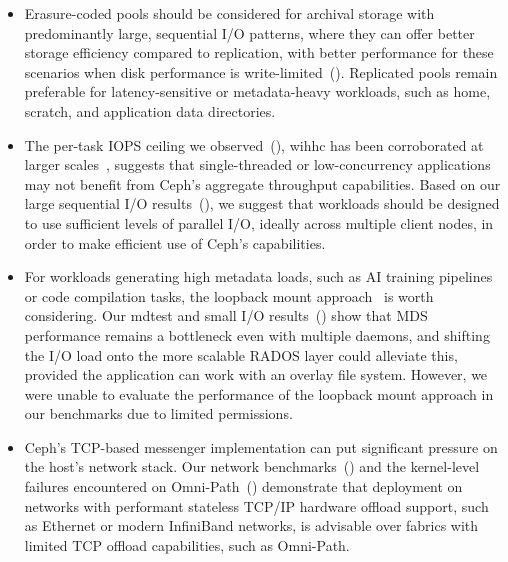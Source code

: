\begin{itemize}
    \item Erasure-coded pools should be considered for archival storage with predominantly large, sequential \ac{I/O} patterns, where they can offer better storage efficiency compared to replication, with better performance for these scenarios when disk performance is write-limited~(). Replicated pools remain preferable for latency-sensitive or metadata-heavy workloads, such as home, scratch, and application data directories.

    \item The per-task \ac{IOPS} ceiling we observed~(), wihhc has been corroborated at larger scales~\cite{ceph-1tib}, suggests that single-threaded or low-concurrency applications may not benefit from Ceph's aggregate throughput capabilities. Based on our large sequential \ac{I/O} results~(), we suggest that workloads should be designed to use sufficient levels of parallel \ac{I/O}, ideally across multiple client nodes, in order to make efficient use of Ceph's capabilities.

    \item For workloads generating high metadata loads, such as \ac{AI} training pipelines or code compilation tasks, the loopback mount approach~\cite{Krotkiewski_2017} is worth considering. Our mdtest and small \ac{I/O} results~() show that \ac{MDS} performance remains a bottleneck even with multiple daemons, and shifting the \ac{I/O} load onto the more scalable \ac{RADOS} layer could alleviate this, provided the application can work with an overlay file system. However, we were unable to evaluate the performance of the loopback mount approach in our benchmarks due to limited permissions.

    \item Ceph's \acs{TCP}-based messenger implementation can put significant pressure on the host's network stack. Our network benchmarks~() and the kernel-level failures encountered on Omni-Path~() demonstrate that deployment on networks with performant stateless \ac{TCP/IP} hardware offload support, such as Ethernet or modern InfiniBand networks, is advisable over fabrics with limited \ac{TCP} offload capabilities, such as Omni-Path.
\end{itemize}